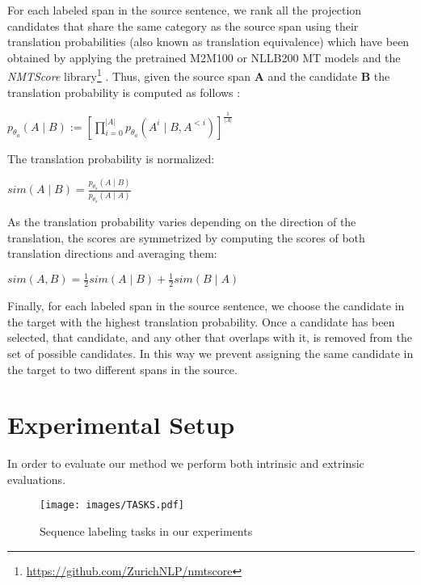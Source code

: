 \documentclass[11pt]{article}
\begin{document}
For each labeled span in the source sentence, we rank all the projection
candidates that share the same category as the source span using their
translation probabilities (also known as translation equivalence) which have
been obtained by
applying the pretrained M2M100 \cite{DBLP:journals/jmlr/FanBSMEGBCWCGBL21} or NLLB200 \cite{DBLP:journals/corr/abs-2207-04672} MT models
 and the \textit{NMTScore}
library\footnote{\url{https://github.com/ZurichNLP/nmtscore}}
\cite{DBLP:journals/corr/abs-2204-13692}. Thus, given the source span $\mathbf{A}$
and the candidate $\mathbf{B}$ the translation probability is computed as
follows \cite{DBLP:journals/corr/abs-2204-13692}:

\begin{center}
  $p_{\theta_a}(A \mid B):=\left[\prod_{i=0}^{|A|} p_{\theta_a}\left(A^i \mid B, A^{<i}\right)\right]^{\frac{1}{|A|}}$
  \end{center}


\noindent The translation probability is normalized:

\begin{center}
$sim(A \mid B) = \frac{p_{\theta_a}(A \mid B)}{p_{\theta_a}(A \mid A)}$
\end{center}

As the translation probability varies depending on the direction of the
translation, the scores are symmetrized by computing the scores of both translation directions and averaging them:

\begin{center}
    $sim(A, B)=\frac{1}{2} sim(A \mid B)+\frac{1}{2} sim(B \mid A)$
\end{center}

Finally, for each labeled span in the source sentence, we choose the candidate
in the target with the highest translation probability. Once a candidate has
been selected, that candidate, and any other that overlaps with it, is
removed from the set of possible candidates. In this way we prevent assigning
the same candidate in the target to two different spans in the source.

\section{Experimental Setup}\label{sec:Methodology}

In order to evaluate our method we perform both intrinsic and extrinsic evaluations. 



\begin{figure*}[htb]
    \centering
    \texttt{[image: images/TASKS.pdf]}
    \caption{Sequence labeling tasks in our experiments}
    \label{fig:Tasks}
\end{figure*}
\end{document}
